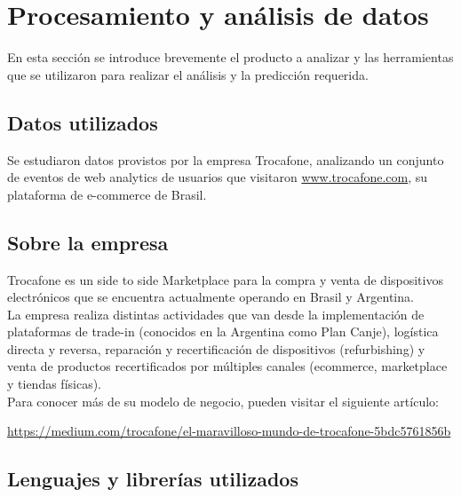 \documentclass[a4paper ,12pt]{article}
\begin{document}
	
	
\tableofcontents %
\newpage

\section{Procesamiento y análisis de datos}\label{sec:intro}

En esta sección se introduce brevemente el producto a analizar y las herramientas que se utilizaron para realizar el análisis y la predicción requerida.



\subsection{Datos utilizados}

Se estudiaron datos provistos por la empresa Trocafone, analizando un conjunto de eventos de web analytics de usuarios que visitaron \url{www.trocafone.com}, su plataforma de e-commerce de Brasil.

\subsection{Sobre la empresa}

 
Trocafone es un side to side Marketplace para la compra y venta de dispositivos electrónicos que se encuentra actualmente operando en Brasil y Argentina. \\


La empresa realiza distintas actividades que van desde la implementación de plataformas de trade-in (conocidos en la Argentina como Plan Canje), logística directa y reversa, reparación y recertificación de dispositivos (refurbishing) y venta de productos recertificados por múltiples canales (ecommerce, marketplace y tiendas físicas).\\ 


Para conocer más de su modelo de negocio, pueden visitar el siguiente artículo:

\url{ https://medium.com/trocafone/el-maravilloso-mundo-de-trocafone-5bdc5761856b}

\subsection{Lenguajes y librerías utilizados}
\end{document}
